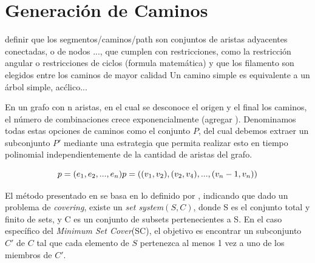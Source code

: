  





\section{Generaci\'on de Caminos}
definir que los segmentos/caminos/path son conjuntos de aristas adyacentes conectadas, o de nodos ..., que cumplen con restricciones, como la restricción angular o restricciones de ciclos (formula matem\'atica) y que los filamento son elegidos entre los caminos de mayor calidad
Un camino simple es equivalente a un \'arbol simple, ac\'clico...


En un grafo con n aristas, en el cual se desconoce el origen y el final los caminos, el n\'umero de combinaciones crece exponencialmente (agregar \cite{buchin2007number}\cite{biswas2012hamiltonian}). Denominamos todas estas opciones de caminos como el conjunto $P$, del cual debemos extraer un subconjunto $P'$ mediante una estrategia que permita realizar esto en tiempo polinomial independientemente de la cantidad de aristas del grafo.

\begin{equation}
p = (e_1, e_2,..., e_n)\\
p = ((v_1,v_2), (v_2,v_4),..., (v_n-1,v_n))
\label{eq:path}
\end{equation}

El m\'etodo presentado en \cite{breuer2015define} se basa en lo definido por \cite{lin2006vertex}, indicando que dado un problema de {\it covering}, existe un {\it set system}$(S,C)$, donde S es el conjunto total y finito de sets, y C es un conjunto de subsets pertenecientes a S. En el caso espec\'ifico del {\it Minimum Set Cover}(SC), el objetivo es encontrar un subconjunto $C'$ de $C$ tal que cada elemento de $S$ pertenezca al menos 1 vez a uno de los miembros de $C'$.

